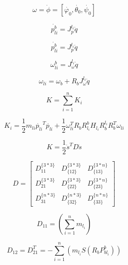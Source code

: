 \documentclass{jarticle}
\begin{document}
\begin{equation}
  \omega = \dot{\phi} = [\dot{\varphi_0}, \dot{\theta_0}, \dot{\psi_0}]
\end{equation}

\begin{equation}
  \dot{p_{li}^b} = J_p^{l_i} \dot{q}
\end{equation}

\begin{equation}
  \dot{p_{li}^b} = J_p^{l_i} \dot{q}
\end{equation}

\begin{equation}
  \omega_{li}^b = J_\omega^{l_i} \dot{q}
\end{equation}

\begin{equation}
  \omega_{li} = \omega_b + R_b J_\omega^{l_i} \dot{q}
\end{equation}

\begin{equation}
  K = \sum_{i=1}^{n} K_i
\end{equation}

\begin{equation}
  K_i = \frac{1}{2} m_{li} \dot{p_{li}}^T \dot{p_{li}} + \frac{1}{2} \omega_{li}^T  R_b R_{l_i}^b H_{l_i} R_b^{l_i} R_b^T \omega_{li}
\end{equation}

\begin{equation}
  K = \frac{1}{2} \dot{s}^T D \dot{s}
\end{equation}

\begin{equation}
  D = \begin{bmatrix}
    D_{11}^{\{3*3\}} & D_{\{12\}}^{\{3*3\}} & D_{\{13\}}^{\{3*n\}}\\
    D_{21}^{\{3*3\}} & D_{\{22\}}^{\{3*3\}} & D_{\{23\}}^{\{3*n\}}\\
    D_{31}^{\{n*3\}} & D_{\{32\}}^{\{n*3\}} & D_{\{33\}}^{\{n*n\}}
  \end{bmatrix}
\end{equation}

\begin{equation}
  D_{11} = (\sum_{i=1}^{n} m_{l_i})
\end{equation}

\begin{equation}
  D_{12} = D_{21}^T = -\sum_{i=1}^{n}(m_{l_i} S(R_b P_{bl_i}^b))
\end{equation}
\end{document}
